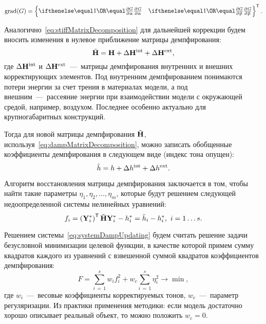 \begin{equation}
	\mathrm{grad}(G) = 
	\trans{
	\left\{ 
	\begin{matrix}
		\partDer{G}{\alpha}{} & \partDer{G}{\beta}{} 
	\end{matrix} 
	\right\}}.
\end{equation}

Аналогично~\eqref{eq:stiffMatrixDecomposition} для дальнейшей коррекции будем вносить изменения в нулевое приближение матрицы демпфирования:
\begin{equation}
	\tilde{\mathbf{H}} = \mathbf{H} + \Delta \mathbf{H} ^ {\text{int}} + \Delta \mathbf{H} ^ {\text{ext}},
	\label{eq:dampMatrixDecomposition}
\end{equation}
где $ \Delta \mathbf{H} ^ {\text{int}} $ и $ \Delta \mathbf{H} ^ {\text{ext}} $~---~матрицы демпфирования внутренних и внешних корректирующих элементов. Под внутренним демпфированием понимаются потери энергии за счет трения в материалах модели, а под внешним~---~рассеяние энергии при взаимодействии модели с окружающей средой, например, воздухом. Последнее особенно актуально для крупногабаритных конструкций.

Тогда для новой матрицы демпфирования $ \tilde{\mathbf{H}} $, используя~\eqref{eq:dampMatrixDecomposition}, можно записать обобщенные коэффициенты демпфирования в следующем виде (индекс тона опущен):
\begin{equation}
	\tilde{h} = h + \Delta h ^ {\text{int}} + \Delta h ^ {\text{ext}}.
	\label{eq:updatedGenDamping}
\end{equation}

Алгоритм восстановления матрицы демпфирования заключается в том, чтобы найти такие параметры $ \eta_1, \eta_2, \hdots, \eta_m $, которые будут решением следующей недоопределенной системы нелинейных уравнений:
\begin{equation}
	f_i = \left( \mathbf{Y}_i ^ \ast \right) ^ \mathsf{T} \tilde{\mathbf{H}} \mathbf{Y}_i ^ \ast - h_i ^ \ast = \tilde{h}_i - h_i ^ \ast, \ i = 1 \hdots s.
	\label{eq:systemDampUpdating}
\end{equation}

Решением системы~\eqref{eq:systemDampUpdating} будем считать решение задачи безусловной минимизации целевой функции, в качестве которой примем сумму квадратов каждого из уравнений с взвешенной суммой квадратов коэффициентов демпфирования:
\begin{equation}
	F = \sum \limits_{i\,=\,1} ^ s w_i f_i ^ 2 + w_c \sum \limits_{i\,=\,1}^s \eta_i ^ 2 \rightarrow \min,
	\label{eq:objFinalDampFunUpdating}
\end{equation}
где $ w_i $~---~весовые коэффициенты корректируемых тонов, $ w_c $~---~параметр регуляризации. Из практики применения методики: если модель достаточно хорошо описывает реальный объект, то можно положить $ w_c = 0 $.

